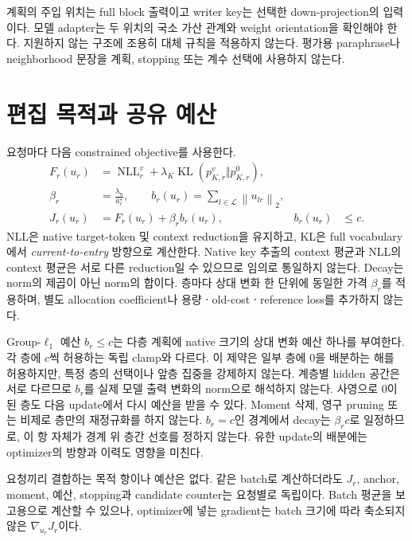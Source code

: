 \documentclass[11pt]{article}
\newcommand{\KL}{\operatorname{KL}}
\newcommand{\NLL}{\operatorname{NLL}}
\newcommand{\norm}[1]{\left\lVert #1\right\rVert}
\begin{document}
계획의 주입 위치는 full block 출력이고 writer key는 선택한
down-projection의 입력이다. 모델 adapter는 두 위치의 국소 가산 관계와
weight orientation을 확인해야 한다. 지원하지 않는 구조에 조용히
대체 규칙을 적용하지 않는다. 평가용 paraphrase나 neighborhood 문장을
계획, stopping 또는 계수 선택에 사용하지 않는다.

\section{편집 목적과 공유 예산}
요청마다 다음 constrained objective를 사용한다.
\begin{align}
 F_r(u_r)
 &=\NLL_r^v+\lambda_K\KL(p^v_{K,r}\Vert p^0_{K,r}),
 \label{eq:task}\\
 \beta_r&=\frac{\lambda_n}{a^\star_r},\qquad
 b_r(u_r)=\sum_{l\in\mathcal L}\norm{u_{lr}}_2,\\
 J_r(u_r)&=F_r(u_r)+\beta_r b_r(u_r),
 & b_r(u_r)&\le c.
 \label{eq:objective}
\end{align}
NLL은 native target-token 및 context reduction을 유지하고, KL은
full vocabulary에서 \emph{current-to-entry} 방향으로 계산한다.
Native key 추출의 context 평균과 NLL의 context 평균은 서로 다른
reduction일 수 있으므로 임의로 통일하지 않는다.
Decay는 norm의 제곱이 아닌 norm의 합이다.
층마다 상대 변화 한 단위에 동일한 가격 $\beta_r$를 적용하며, 별도
allocation coefficient나 용량ㆍold-costㆍreference loss를 추가하지 않는다.

Group-$\ell_1$ 예산 $b_r\le c$는 다층 계획에 native 크기의 상대 변화
예산 하나를 부여한다. 각 층에 $c$씩 허용하는 독립 clamp와 다르다.
이 제약은 일부 층에 0을 배분하는 해를 허용하지만, 특정 층의 선택이나
앞층 집중을 강제하지 않는다. 계층별 hidden 공간은 서로 다르므로
$b_r$를 실제 모델 출력 변화의 norm으로 해석하지 않는다.
사영으로 0이 된 층도 다음 update에서 다시 예산을 받을 수 있다.
Moment 삭제, 영구 pruning 또는 비제로 층만의 재정규화를 하지 않는다.
$b_r=c$인 경계에서 decay는 $\beta_r c$로 일정하므로, 이 항 자체가
경계 위 층간 선호를 정하지 않는다. 유한 update의 배분에는 optimizer의
방향과 이력도 영향을 미친다.

요청끼리 결합하는 목적 항이나 예산은 없다. 같은 batch로 계산하더라도
$J_r$, anchor, moment, 예산, stopping과 candidate counter는 요청별로
독립이다. Batch 평균을 보고용으로 계산할 수 있으나, optimizer에 넣는
gradient는 batch 크기에 따라 축소되지 않은 $\nabla_{u_r}J_r$이다.
\end{document}
